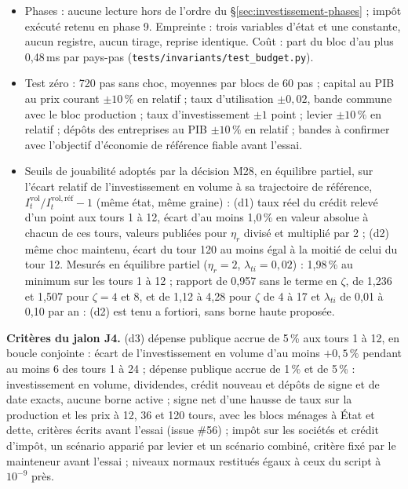 \documentclass[11pt,a4paper]{article}
\begin{document}
\begin{proposee}
\begin{itemize}
\item Phases : aucune lecture hors de l'ordre du \S\ref{sec:investissement-phases} ; impôt exécuté retenu en phase 9. Empreinte : trois variables d'état et une constante, aucun registre, aucun tirage, reprise identique. Coût : part du bloc d'au plus 0,48\,ms par pays-pas (\nolinkurl{tests/invariants/test_budget.py}).
\item Test zéro : 720 pas sans choc, moyennes par blocs de 60 pas ; capital au PIB au prix courant $\pm 10\,\%$ en relatif ; taux d'utilisation $\pm 0{,}02$, bande commune avec le bloc production ; taux d'investissement $\pm 1$ point ; levier $\pm 10\,\%$ en relatif ; dépôts des entreprises au PIB $\pm 10\,\%$ en relatif ; bandes à confirmer avec l'objectif d'économie de référence fiable avant l'essai.
\item Seuils de jouabilité adoptés par la décision M28, en équilibre partiel, sur l'écart relatif de l'investissement en volume à sa trajectoire de référence, $I^{\mathrm{vol}}_t/I^{\mathrm{vol},\mathrm{réf}}_t - 1$ (même état, même graine) : (d1) taux réel du crédit relevé d'un point aux tours 1 à 12, écart d'au moins 1,0\,\% en valeur absolue à chacun de ces tours, valeurs publiées pour $\eta_r$ divisé et multiplié par 2 ; (d2) même choc maintenu, écart du tour 120 au moins égal à la moitié de celui du tour 12. Mesurés en équilibre partiel ($\eta_r = 2$, $\lambda_{\mathit{ti}} = 0{,}02$) : 1,98\,\% au minimum sur les tours 1 à 12 ; rapport de 0,957 sans le terme en $\zeta$, de 1,236 et 1,507 pour $\zeta = 4$ et 8, et de 1,12 à 4,28 pour $\zeta$ de 4 à 17 et $\lambda_{\mathit{ti}}$ de 0,01 à 0,10 par an : (d2) est tenu a fortiori, sans borne haute proposée.
\end{itemize}

\textbf{Critères du jalon J4.} (d3) dépense publique accrue de 5\,\% aux tours 1 à 12, en boucle conjointe : écart de l'investissement en volume d'au moins $+0{,}5\,\%$ pendant au moins 6 des tours 1 à 24 ; dépense publique accrue de 1\,\% et de 5\,\% : investissement en volume, dividendes, crédit nouveau et dépôts de signe et de date exacts, aucune borne active ; signe net d'une hausse de taux sur la production et les prix à 12, 36 et 120 tours, avec les blocs ménages à État et dette, critères écrits avant l'essai (issue \#56) ; impôt sur les sociétés et crédit d'impôt, un scénario apparié par levier et un scénario combiné, critère fixé par le mainteneur avant l'essai ; niveaux normaux restitués égaux à ceux du script à $10^{-9}$ près.


\end{proposee}
\end{document}
